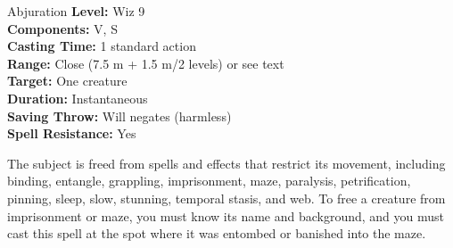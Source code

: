 {Abjuration}
{
	\textbf{Level:}
	Wiz 9\\
	\textbf{Components:}
	V, S\\
	\textbf{Casting Time:}
	1 standard action\\
	\textbf{Range:}
	Close (7.5 m + 1.5 m/2 levels) or see text\\
	\textbf{Target:}
	One creature\\
	\textbf{Duration:}
	Instantaneous\\
	\textbf{Saving Throw:}
	Will negates (harmless)\\
	\textbf{Spell Resistance:}
	Yes\\
}
{
	The subject is freed from spells and effects that restrict its movement, including binding, entangle, grappling, imprisonment, maze, paralysis, petrification, pinning, sleep, slow, stunning, temporal stasis, and web. To free a creature from imprisonment or maze, you must know its name and background, and you must cast this spell at the spot where it was entombed or banished into the maze.

}
